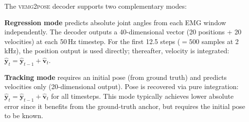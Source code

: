 \documentclass[10pt]{article}
\begin{document}
The \textsc{vemg2pose} decoder supports two complementary modes:

\textbf{Regression mode} predicts absolute joint angles from each EMG window independently. The decoder outputs a 40-dimensional vector (20 positions + 20 velocities) at each 50\,Hz timestep. For the first 12.5 steps ($= 500$ samples at 2\,kHz), the position output is used directly; thereafter, velocity is integrated: $\hat{\mathbf{y}}_t = \hat{\mathbf{y}}_{t-1} + \hat{\mathbf{v}}_t$.

\textbf{Tracking mode} requires an initial pose (from ground truth) and predicts velocities only (20-dimensional output). Pose is recovered via pure integration: $\hat{\mathbf{y}}_t = \hat{\mathbf{y}}_{t-1} + \hat{\mathbf{v}}_t$ for all timesteps. This mode typically achieves lower absolute error since it benefits from the ground-truth anchor, but requires the initial pose to be known.
\end{document}
